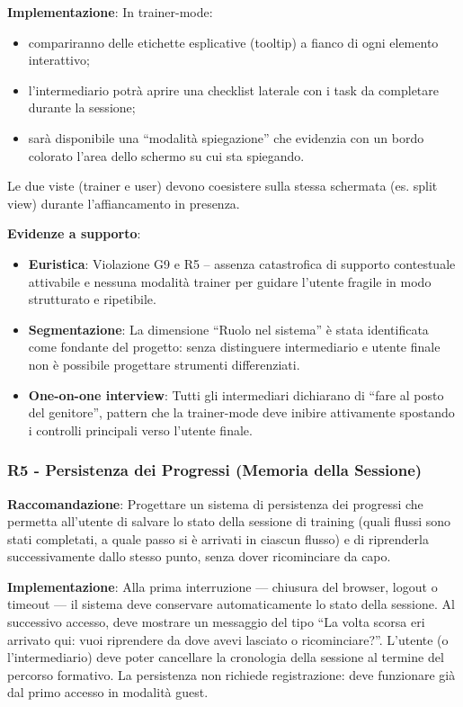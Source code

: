 \documentclass[11pt,a4paper]{article}
\begin{document}
\textbf{Implementazione}: In trainer-mode:
\begin{itemize}
    \item compariranno delle etichette esplicative (tooltip) a fianco di ogni
    elemento interattivo;
    \item l'intermediario potr\`a aprire una checklist laterale con i task da
    completare durante la sessione;
    \item sar\`a disponibile una “modalit\`a spiegazione” che evidenzia con un
    bordo colorato l'area dello schermo su cui sta spiegando.
\end{itemize}
Le due viste (trainer e user) devono coesistere sulla stessa schermata
(es. split view) durante l'affiancamento in presenza.

\textbf{Evidenze a supporto}:
\begin{itemize}
    \item \textbf{Euristica}: Violazione G9 e R5 -- assenza catastrofica di
    supporto contestuale attivabile e nessuna modalit\`a trainer per guidare
    l'utente fragile in modo strutturato e ripetibile.
    \item \textbf{Segmentazione}: La dimensione “Ruolo nel sistema” \`e stata
    identificata come fondante del progetto: senza distinguere intermediario
    e utente finale non \`e possibile progettare strumenti differenziati.
    \item \textbf{One-on-one interview}: Tutti gli intermediari dichiarano
    di “fare al posto del genitore”, pattern che la trainer-mode deve inibire
    attivamente spostando i controlli principali verso l'utente finale.
\end{itemize}

\subsubsection{R5 - Persistenza dei Progressi (Memoria della Sessione)}
\label{rec:R5}

\textbf{Raccomandazione}: Progettare un sistema di persistenza dei progressi
che permetta all'utente di salvare lo stato della sessione di training (quali
flussi sono stati completati, a quale passo si \`e arrivati in ciascun flusso)
e di riprenderla successivamente dallo stesso punto, senza dover ricominciare
da capo.

\textbf{Implementazione}: Alla prima interruzione — chiusura del browser,
logout o timeout — il sistema deve conservare automaticamente lo stato della
sessione. Al successivo accesso, deve mostrare un messaggio del tipo ``La
volta scorsa eri arrivato qui: vuoi riprendere da dove avevi lasciato o
ricominciare?''. L'utente (o l'intermediario) deve poter cancellare la cronologia
della sessione al termine del percorso formativo. La persistenza non richiede
registrazione: deve funzionare gi\`a dal primo accesso in modalit\`a guest.
\end{document}
